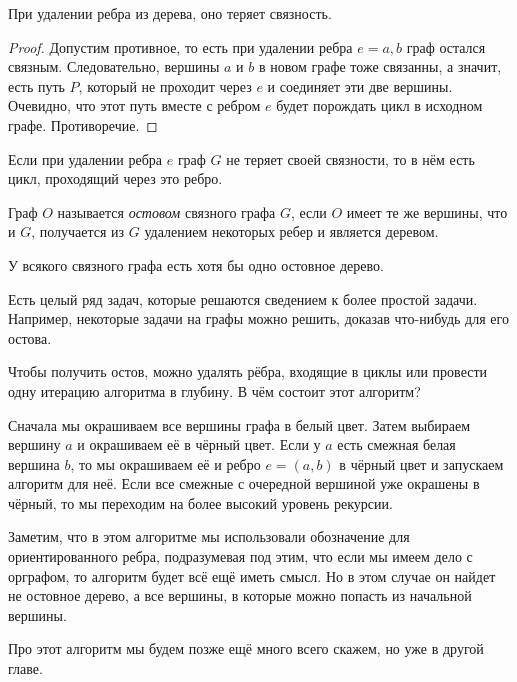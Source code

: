 \begin{statement}
	При удалении ребра из дерева, оно теряет связность.
	
\begin{proof}
	Допустим противное, то есть при удалении ребра $e = {a, b}$ граф остался связным. Следовательно, вершины $a$ и $b$ в новом графе тоже связанны, а значит, есть путь $P$, который не проходит через $e$ и соединяет эти две вершины. Очевидно, что этот путь вместе с ребром $e$ будет порождать цикл в исходном графе. Противоречие.
\end{proof}
\end{statement}

\begin{consequence}
	Если при удалении ребра $e$ граф $G$ не теряет своей связности, то в нём есть цикл, проходящий через это ребро.
\end{consequence}

\begin{definition}
	Граф $O$ называется \emph{остовом} связного графа $G$, если $O$ имеет те же вершины, что и $G$, получается из $G$ удалением некоторых ребер и является деревом.
\end{definition}

\begin{statement}
	У всякого связного графа есть хотя бы одно остовное дерево.
\end{statement}

	Есть целый ряд задач, которые решаются сведением к более простой задачи. Например, некоторые задачи на графы можно решить, доказав что-нибудь для его остова.
	
	Чтобы получить остов, можно удалять рёбра, входящие в циклы или провести одну итерацию алгоритма в глубину. В чём состоит этот алгоритм?
	
	Сначала мы окрашиваем все вершины графа в белый цвет. Затем выбираем вершину $a$ и окрашиваем её в чёрный цвет. Если у $a$ есть смежная белая вершина $b$, то мы окрашиваем её и ребро $e = (a, b)$ в чёрный цвет и запускаем алгоритм для неё. Если все смежные с очередной вершиной уже окрашены в чёрный, то мы переходим на более высокий уровень рекурсии.
	
	Заметим, что в этом алгоритме мы использовали обозначение для ориентированного ребра, подразумевая под этим, что если мы имеем дело с орграфом, то алгоритм будет всё ещё иметь смысл. Но в этом случае он найдет не остовное дерево, а все вершины, в которые можно попасть из начальной вершины.

	Про этот алгоритм мы будем позже ещё много всего скажем, но уже в другой главе.
	


